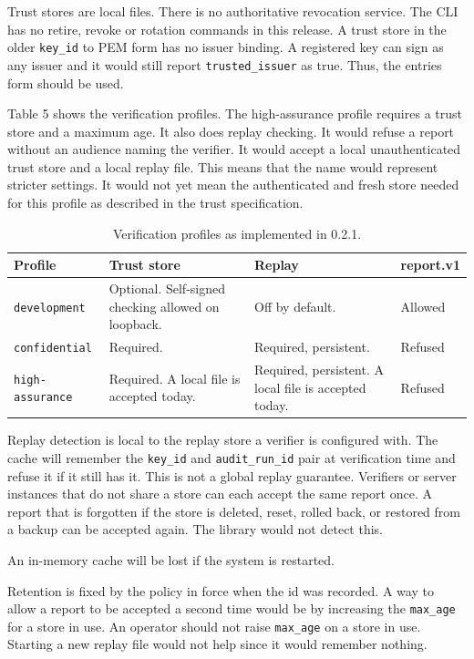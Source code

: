 \documentclass[10pt,a4paper]{article}
\begin{document}
Trust stores are local files. There is no authoritative revocation service. The CLI has no retire, revoke or rotation commands in this release. A trust store in the older \texttt{key\_id} to PEM form has no issuer binding. A registered key can sign as any issuer and it would still report \texttt{trusted\_issuer} as true. Thus, the entries form should be used.

Table 5 shows the verification profiles. The high-assurance profile requires a trust store and a maximum age. It also does replay checking. It would refuse a report without an audience naming the verifier. It would accept a local unauthenticated trust store and a local replay file. This means that the name would represent stricter settings. It would not yet mean the authenticated and fresh store needed for this profile as described in the trust specification.

\begin{table}[h]
\small
\caption{Verification profiles as implemented in 0.2.1.}
\begin{tabularx}{\textwidth}{l Y Y l}
\toprule
\textbf{Profile} & \textbf{Trust store} & \textbf{Replay} & \textbf{report.v1} \\
\midrule
\texttt{development}    & Optional. Self-signed checking allowed on loopback. & Off by default. & Allowed \\
\texttt{confidential}   & Required. & Required, persistent. & Refused \\
\texttt{high-assurance} & Required. A local file is accepted today. & Required, persistent. A local file is accepted today. & Refused \\
\bottomrule
\end{tabularx}
\end{table}

Replay detection is local to the replay store a verifier is configured with. The cache will remember the \texttt{key\_id} and \texttt{audit\_run\_id} pair at verification time and refuse it if it still has it. This is not a global replay guarantee. Verifiers or server instances that do not share a store can each accept the same report once. A report that is forgotten if the store is deleted, reset, rolled back, or restored from a backup can be accepted again. The library would not detect this.

An in-memory cache will be lost if the system is restarted.

Retention is fixed by the policy in force when the id was recorded. A way to allow a report to be accepted a second time would be by increasing the \texttt{max\_age} for a store in use. An operator should not raise \texttt{max\_age} on a store in use. Starting a new replay file would not help since it would remember nothing.
\end{document}
